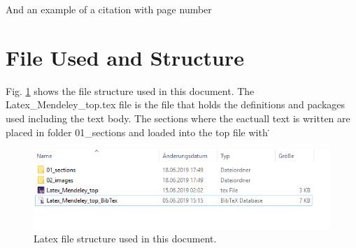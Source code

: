 And an example of a citation with page number \cite[1, 2]{1513092}
\section{File Used and Structure}
Fig. \ref{fig:latexfilestructure} shows the file structure used in this document. The Latex\_Mendeley\_top.tex file is the file that holds the definitions and packages used including the text body. The sections where the eactuall text is written are placed in folder 01\_sections and loaded into the top file with \. 
\begin{figure}[H]
	\centering
	\includegraphics[width=1.0\textwidth]{02_images/latex_file_structure}
	\caption{Latex file structure used in this document.}
	\label{fig:latexfilestructure}
\end{figure}
